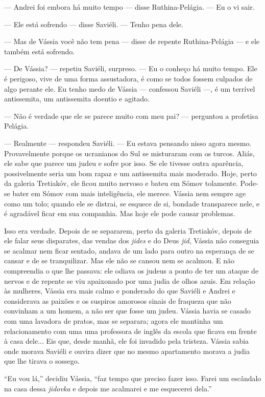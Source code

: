 --- Andrei foi embora há muito tempo --- disse Ruthina-Pelágia. --- Eu o
vi sair.

--- Ele está sofrendo --- disse Saviéli. --- Tenho pena dele.

--- Mas de Vássia você não tem pena --- disse de repente Ruthina-Pelágia
--- e ele também está sofrendo.

--- De Vássia? --- repetiu Saviéli, surpreso. --- Eu o conheço há muito
tempo. Ele é perigoso, vive de uma forma assustadora, é como se todos
fossem culpados de algo perante ele. Eu tenho medo de Vássia ---
confessou Saviéli ---, é um terrível antissemita, um antissemita doentio
e agitado.

--- Não é verdade que ele se parece muito com meu pai? --- perguntou a
profetisa Pelágia.

--- Realmente --- respondeu Saviéli. --- Eu estava pensando nisso agora
mesmo. Provavelmente porque os ucranianos do Sul se misturaram com os
turcos. Aliás, ele sabe que parece um judeu e sofre por isso. Se ele
tivesse outra aparência, possivelmente seria um bom rapaz e um
antissemita mais moderado. Hoje, perto da galeria Tretiakóv, ele ficou
muito nervoso e bateu em Sómov tolamente. Pode-se bater em Sómov com
mais inteligência, ele merece. Vássia nem sempre age como um tolo;
quando ele se distrai, se esquece de si, bondade transparece nele, e é
agradável ficar em sua companhia. Mas hoje ele pode causar problemas.

Isso era verdade. Depois de se separarem, perto da galeria Tretiakóv,
depois de ele falar seus disparates, das vendas dos \emph{jides} e do
Deus \emph{jid}, Vássia não conseguia se acalmar nem ficar sentado,
andava de um lado para outro na esperança de se cansar e de se
tranquilizar. Mas ele não se cansou nem se acalmou. E não compreendia o
que lhe passava: ele odiava os judeus a ponto de ter um ataque de nervos
e de repente se viu apaixonado por uma judia de olhos azuis. Em relação
às mulheres, Vássia era mais calmo e ponderado do que Saviéli e Andrei e
considerava as paixões e os suspiros amorosos sinais de fraqueza que não
convinham a um homem, a não ser que fosse um judeu. Vássia havia se
casado com uma lavadora de pratos, mas se separara; agora ele mantinha
um relacionamento com uma uma professora de inglês da escola que ficava
em frente à casa dele... Eis que, desde manhã, ele foi invadido pela
tristeza. Vássia sabia onde morava Saviéli e ouvira dizer que no mesmo
apartamento morava a judia que lhe tirava o sossego.

``Eu vou lá,'' decidiu Vássia, ``faz tempo que preciso fazer isso. Farei
um escândalo na casa dessa \emph{jidovka} e depois me acalmarei e me
esquecerei dela.''

